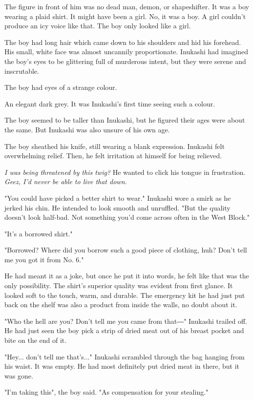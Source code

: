 The figure in front of him was no dead man, demon, or shapeshifter. It
was a boy wearing a plaid shirt. It might have been a girl. No, it was a
boy. A girl couldn't produce an icy voice like that. The boy only looked
like a girl.

The boy had long hair which came down to his shoulders and hid his
forehead. His small, white face was almost uncannily proportionate.
Inukashi had imagined the boy's eyes to be glittering full of murderous
intent, but they were serene and inscrutable.

The boy had eyes of a strange colour.

An elegant dark grey. It was Inukashi's first time seeing such a colour.

The boy seemed to be taller than Inukashi, but he figured their ages
were about the same. But Inukashi was also unsure of his own age.

The boy sheathed his knife, still wearing a blank expression. Inukashi
felt overwhelming relief. Then, he felt irritation at himself for being
relieved.

\emph{I was being threatened by this twig?} He wanted to click his tongue in
frustration. \emph{Geez, I'd never be able to live that down.}

"You could have picked a better shirt to wear." Inukashi wore a smirk as
he jerked his chin. He intended to look smooth and unruffled. "But the
quality doesn't look half-bad. Not something you'd come across often in
the West Block."

"It's a borrowed shirt."

"Borrowed? Where did you borrow such a good piece of clothing, huh?
Don't tell me you got it from No. 6."

He had meant it as a joke, but once he put it into words, he felt like
that was the only possibility. The shirt's superior quality was evident
from first glance. It looked soft to the touch, warm, and durable. The
emergency kit he had just put back on the shelf was also a product from
inside the walls, no doubt about it.

"Who the hell are you? Don't tell me you came from that―" Inukashi
trailed off. He had just seen the boy pick a strip of dried meat out of
his breast pocket and bite on the end of it.

"Hey... don't tell me that's..." Inukashi scrambled through the bag
hanging from his waist. It was empty. He had most definitely put dried
meat in there, but it was gone.

"I'm taking this", the boy said. "As compensation for your stealing."

